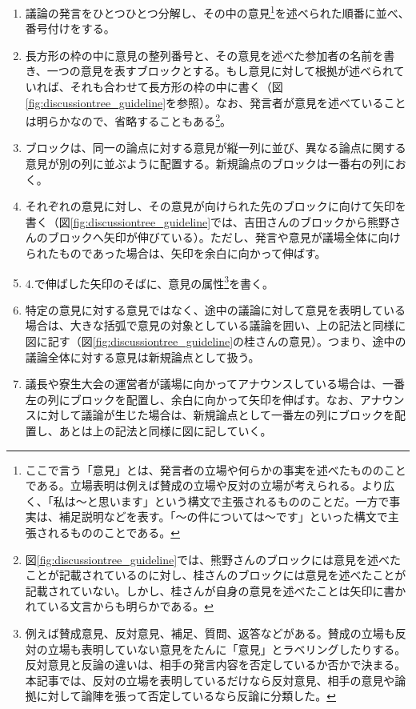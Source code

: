 \begin{enumerate}
  \item 議論の発言をひとつひとつ分解し、その中の意見\footnote{ここで言う「意見」とは、発言者の立場や何らかの事実を述べたもののことである。立場表明は例えば賛成の立場や反対の立場が考えられる。より広く、「私は～と思います」という構文で主張されるもののことだ。一方で事実は、補足説明などを表す。「～の件については～です」といった構文で主張されるもののことである。}を述べられた順番に並べ、番号付けをする。
    \item 長方形の枠の中に意見の整列番号と、その意見を述べた参加者の名前を書き、一つの意見を表すブロックとする。もし意見に対して根拠が述べられていれば、それも合わせて長方形の枠の中に書く（図\ref{fig:discussiontree_guideline}を参照）。なお、発言者が意見を述べていることは明らかなので、省略することもある\footnote{図\ref{fig:discussiontree_guideline}では、熊野さんのブロックには意見を述べたことが記載されているのに対し、桂さんのブロックには意見を述べたことが記載されていない。しかし、桂さんが自身の意見を述べたことは矢印に書かれている文言からも明らかである。}。
  \item ブロックは、同一の論点に対する意見が縦一列に並び、異なる論点に関する意見が別の列に並ぶように配置する。新規論点のブロックは一番右の列におく。
  \item それぞれの意見に対し、その意見が向けられた先のブロックに向けて矢印を書く（図\ref{fig:discussiontree_guideline}では、吉田さんのブロックから熊野さんのブロックへ矢印が伸びている）。ただし、発言や意見が議場全体に向けられたものであった場合は、矢印を余白に向かって伸ばす。
  \item 4.で伸ばした矢印のそばに、意見の属性\footnote{例えば賛成意見、反対意見、補足、質問、返答などがある。賛成の立場も反対の立場も表明していない意見をたんに「意見」とラベリングしたりする。反対意見と反論の違いは、相手の発言内容を否定しているか否かで決まる。本記事では、反対の立場を表明しているだけなら反対意見、相手の意見や論拠に対して論陣を張って否定しているなら反論に分類した。}を書く。
  \item 特定の意見に対する意見ではなく、途中の議論に対して意見を表明している場合は、大きな括弧で意見の対象としている議論を囲い、上の記法と同様に図に記す（図\ref{fig:discussiontree_guideline}の桂さんの意見）。つまり、途中の議論全体に対する意見は新規論点として扱う。
  \item 議長や寮生大会の運営者が議場に向かってアナウンスしている場合は、一番左の列にブロックを配置し、余白に向かって矢印を伸ばす。なお、アナウンスに対して議論が生じた場合は、新規論点として一番左の列にブロックを配置し、あとは上の記法と同様に図に記していく。
\end{enumerate}

